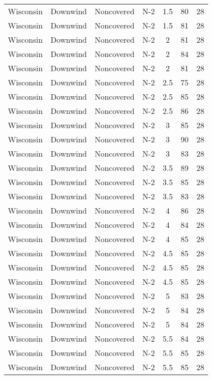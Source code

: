 \documentclass{article}
\begin{document}
\begin{longtable}[H]{ccccccc}
Wisconsin & Downwind & Noncovered & N-2 & 1.5  & 80  & 28 \\
Wisconsin & Downwind & Noncovered & N-2 & 1.5  & 81  & 28 \\
Wisconsin & Downwind & Noncovered & N-2 & 2    & 81  & 28 \\
Wisconsin & Downwind & Noncovered & N-2 & 2    & 84  & 28 \\
Wisconsin & Downwind & Noncovered & N-2 & 2    & 81  & 28 \\
Wisconsin & Downwind & Noncovered & N-2 & 2.5  & 75  & 28 \\
Wisconsin & Downwind & Noncovered & N-2 & 2.5  & 85  & 28 \\
Wisconsin & Downwind & Noncovered & N-2 & 2.5  & 86  & 28 \\
Wisconsin & Downwind & Noncovered & N-2 & 3    & 85  & 28 \\
Wisconsin & Downwind & Noncovered & N-2 & 3    & 90  & 28 \\
Wisconsin & Downwind & Noncovered & N-2 & 3    & 83  & 28 \\
Wisconsin & Downwind & Noncovered & N-2 & 3.5  & 89  & 28 \\
Wisconsin & Downwind & Noncovered & N-2 & 3.5  & 85  & 28 \\
Wisconsin & Downwind & Noncovered & N-2 & 3.5  & 83  & 28 \\
Wisconsin & Downwind & Noncovered & N-2 & 4    & 86  & 28 \\
Wisconsin & Downwind & Noncovered & N-2 & 4    & 84  & 28 \\
Wisconsin & Downwind & Noncovered & N-2 & 4    & 85  & 28 \\
Wisconsin & Downwind & Noncovered & N-2 & 4.5  & 85  & 28 \\
Wisconsin & Downwind & Noncovered & N-2 & 4.5  & 85  & 28 \\
Wisconsin & Downwind & Noncovered & N-2 & 4.5  & 85  & 28 \\
Wisconsin & Downwind & Noncovered & N-2 & 5    & 83  & 28 \\
Wisconsin & Downwind & Noncovered & N-2 & 5    & 84  & 28 \\
Wisconsin & Downwind & Noncovered & N-2 & 5    & 84  & 28 \\
Wisconsin & Downwind & Noncovered & N-2 & 5.5  & 84  & 28 \\
Wisconsin & Downwind & Noncovered & N-2 & 5.5  & 85  & 28 \\
Wisconsin & Downwind & Noncovered & N-2 & 5.5  & 85  & 28 \\

\end{longtable}
\end{document}
